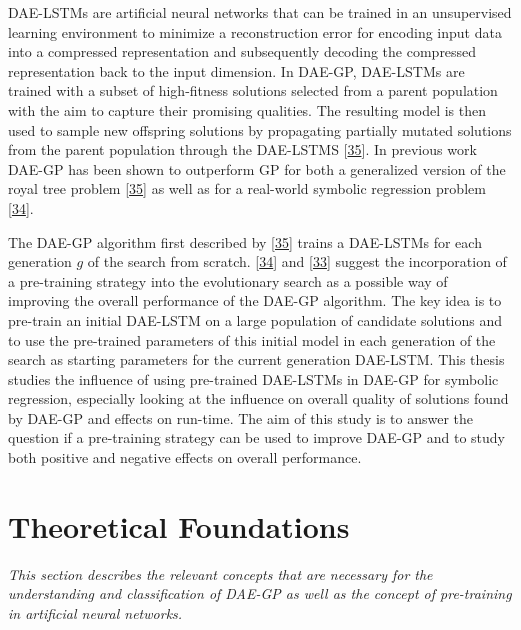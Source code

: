 \documentclass[
  11pt,
]{article}
\begin{document}
DAE-LSTMs are artificial neural networks that can be trained in an unsupervised learning environment to minimize a reconstruction error for encoding input data into a compressed representation and subsequently decoding the compressed representation back to the input dimension.
In DAE-GP, DAE-LSTMs are trained with a subset of high-fitness solutions selected from a parent population with the aim to capture their promising qualities.
The resulting model is then used to sample new offspring solutions by propagating partially mutated solutions from the parent population through the DAE-LSTMS {[}\protect\hyperlink{ref-dae-gp_2020_rtree}{35}{]}.
In previous work DAE-GP has been shown to outperform GP for both a generalized version of the royal tree problem {[}\protect\hyperlink{ref-dae-gp_2020_rtree}{35}{]} as well as for a real-world symbolic regression problem {[}\protect\hyperlink{ref-dae-gp_2022_symreg}{34}{]}.

The DAE-GP algorithm first described by {[}\protect\hyperlink{ref-dae-gp_2020_rtree}{35}{]} trains a DAE-LSTMs for each generation \(g\) of the search from scratch.
{[}\protect\hyperlink{ref-dae-gp_2022_symreg}{34}{]} and {[}\protect\hyperlink{ref-daegp_explore_exploit}{33}{]} suggest the incorporation of a pre-training strategy into the evolutionary search as a possible way of improving the overall performance of the DAE-GP algorithm.
The key idea is to pre-train an initial DAE-LSTM on a large population of candidate solutions and to use the pre-trained parameters of this initial model in each generation of the search as starting parameters for the current generation DAE-LSTM.
This thesis studies the influence of using pre-trained DAE-LSTMs in DAE-GP for symbolic regression, especially looking at the influence on overall quality of solutions found by DAE-GP and effects on run-time.
The aim of this study is to answer the question if a pre-training strategy can be used to improve DAE-GP and to study both positive and negative effects on overall performance.

\hypertarget{theoretical-foundations}{%
\section{Theoretical Foundations}\label{theoretical-foundations}}

\emph{This section describes the relevant concepts that are necessary for the understanding and classification of DAE-GP as well as the concept of pre-training in artificial neural networks.}
\end{document}
